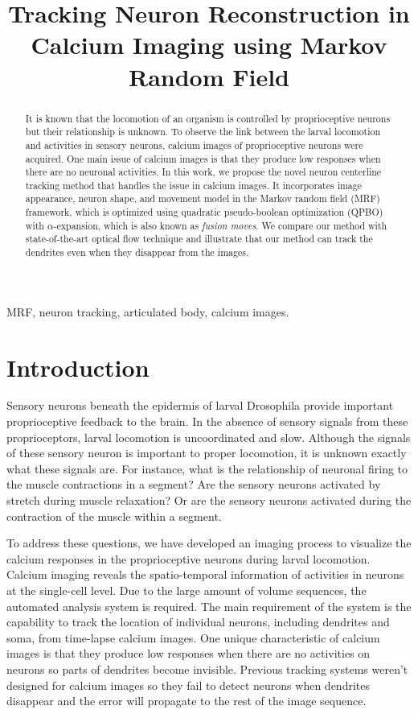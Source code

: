 \documentclass{article}
\title{Tracking Neuron Reconstruction in Calcium Imaging using Markov Random Field }
\begin{document}
%
\maketitle
%
\begin{abstract}
It is known that the locomotion of an organism is controlled by proprioceptive neurons but their relationship is unknown. To observe the link between the larval locomotion and activities in sensory neurons, calcium images of proprioceptive neurons were acquired. One main issue of calcium images is that they produce low responses when there are no neuronal activities. In this work, we propose the novel neuron centerline tracking method that handles the issue in calcium images. It incorporates image appearance, neuron shape, and movement model in the Markov random field (MRF) framework, which is optimized using quadratic pseudo-boolean optimization (QPBO) with $\alpha$-expansion, which is also known as \emph{fusion moves}. We compare our method with state-of-the-art optical flow technique and illustrate that our method can track the dendrites even when they disappear from the images.
\end{abstract}
%
\begin{keywords}
MRF, neuron tracking, articulated body, calcium images.
\end{keywords}
%
\section{Introduction}
\label{sec:intro}
Sensory neurons beneath the epidermis of larval Drosophila provide important proprioceptive feedback to the brain. In the absence of sensory signals from these proprioceptors, larval locomotion is uncoordinated and slow. Although the signals of these sensory neuron is important to proper locomotion, it is unknown exactly what these signals are. For instance, what is the relationship of neuronal firing to the muscle contractions in a segment? Are the sensory neurons activated by stretch during muscle relaxation? Or are the sensory neurons activated during the contraction of the muscle within a segment. 

To address these questions, we have developed an imaging process to visualize the calcium responses in the proprioceptive neurons during larval locomotion. Calcium imaging reveals the spatio-temporal information of activities in neurons at the single-cell level. Due to the large amount of volume sequences, the automated analysis system is required. The main requirement of the system is the capability to track the location of individual neurons, including dendrites and soma, from time-lapse calcium images. One unique characteristic of calcium images is that they produce low responses when there are no activities on neurons so parts of dendrites become invisible. Previous tracking systems weren't designed for calcium images so they fail to detect neurons when dendrites disappear and the error will propagate to the rest of the image sequence.
\end{document}
